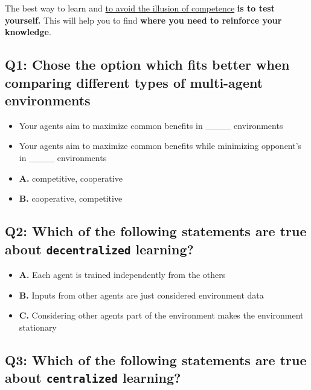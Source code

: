 \documentclass[11pt,a4paper]{article}
\begin{document}
The best way to learn and \href{https://www.coursera.org/lecture/learning-how-to-learn/illusions-of-competence-BuFzf}{to avoid the illusion of competence} \textbf{is to test yourself.} This will help you to find \textbf{where you need to reinforce your knowledge}.

\subsection{Q1: Chose the option which fits better when comparing different types of multi-agent environments}\label{q1-chose-the-option-which-fits-better-when-comparing-different-types-of-multi-agent-environments}

\begin{itemize}
\item
  Your agents aim to maximize common benefits in \_\_\_\_ environments
\item
  Your agents aim to maximize common benefits while minimizing opponent's in \_\_\_\_ environments
\item
  \textbf{A.} competitive, cooperative
\item
  \textbf{B.} cooperative, competitive
\end{itemize}

\subsection{\texorpdfstring{Q2: Which of the following statements are true about \texttt{decentralized} learning?}{Q2: Which of the following statements are true about decentralized learning?}}\label{q2-which-of-the-following-statements-are-true-about-decentralized-learning}

\begin{itemize}
\tightlist
\item
  \textbf{A.} Each agent is trained independently from the others
\item
  \textbf{B.} Inputs from other agents are just considered environment data
\item
  \textbf{C.} Considering other agents part of the environment makes the environment stationary
\end{itemize}

\subsection{\texorpdfstring{Q3: Which of the following statements are true about \texttt{centralized} learning?}{Q3: Which of the following statements are true about centralized learning?}}\label{q3-which-of-the-following-statements-are-true-about-centralized-learning}
\end{document}
